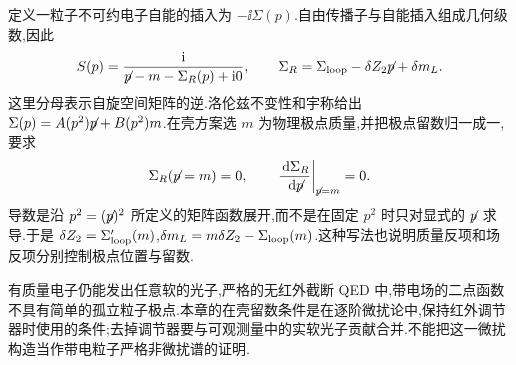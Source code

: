 定义一粒子不可约电子自能的插入为 $-\ii\Sigma(p)$.自由传播子与自能插入组成几何级数,因此
\begin{equation}
 S(p)=\frac{\ii}{\slashed p-m-\Sigma_R(p)+\ii0},\qquad
 \Sigma_R=\Sigma_{\rm loop}-\delta Z_2\slashed p+\delta m_L.
 \label{eq:qed-electron-full-propagator}
\end{equation}
这里分母表示自旋空间矩阵的逆.洛伦兹不变性和宇称给出 $\Sigma(p)=A(p^2)\slashed p+B(p^2)m$.在壳方案选 $m$ 为物理极点质量,并把极点留数归一成一,要求
\begin{equation}
 \Sigma_R(\slashed p=m)=0,\qquad
 \left.\frac{\dd\Sigma_R}{\dd\slashed p}\right|_{\slashed p=m}=0.
 \label{eq:qed-os-conditions}
\end{equation}
导数是沿 $p^2=(\slashed p)^2$ 所定义的矩阵函数展开,而不是在固定 $p^2$ 时只对显式的 $\slashed p$ 求导.于是 $\delta Z_2=\Sigma'_{\rm loop}(m)$,$\delta m_L=m\delta Z_2-\Sigma_{\rm loop}(m)$.这种写法也说明质量反项和场反项分别控制极点位置与留数.

\begin{remark}
有质量电子仍能发出任意软的光子,严格的无红外截断 QED 中,带电场的二点函数不具有简单的孤立粒子极点.本章的在壳留数条件是在逐阶微扰论中,保持红外调节器时使用的条件;去掉调节器要与可观测量中的实软光子贡献合并.不能把这一微扰构造当作带电粒子严格非微扰谱的证明.
\end{remark}



